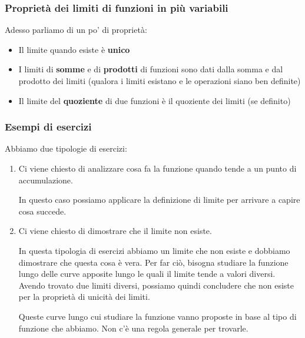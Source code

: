 \filbreak{}

\subsubsection{Proprietà dei limiti di funzioni in più variabili}

Adesso parliamo di un po' di proprietà:

\begin{itemize}
    \item Il limite quando esiste è \textbf{unico}
    \item I limiti di \textbf{somme} e di \textbf{prodotti} di funzioni sono dati dalla somma e dal prodotto dei limiti (qualora i limiti esistano e le operazioni siano ben definite)
    \item Il limite del \textbf{quoziente} di due funzioni è il quoziente dei limiti (se definito)
\end{itemize}


\pagebreak

\subsubsection{Esempi di esercizi}

Abbiamo due tipologie di esercizi:

\begin{enumerate}
    \item Ci viene chiesto di analizzare cosa fa la funzione quando tende a un punto di accumulazione.

          In questo caso possiamo applicare la definizione di limite per arrivare a capire cosa succede.
    \item Ci viene chiesto di dimostrare che il limite non esiste.

          In questa tipologia di esercizi abbiamo un limite che non esiste e dobbiamo dimostrare che questa cosa è vera. Per far ciò, bisogna studiare la funzione lungo delle curve apposite lungo le quali il limite tende a valori diversi. Avendo trovato due limiti diversi, possiamo quindi concludere che non esiste per la proprietà di unicità dei limiti.

          Queste curve lungo cui studiare la funzione vanno proposte in base al tipo di funzione che abbiamo. Non c'è una regola generale per trovarle.
\end{enumerate}

